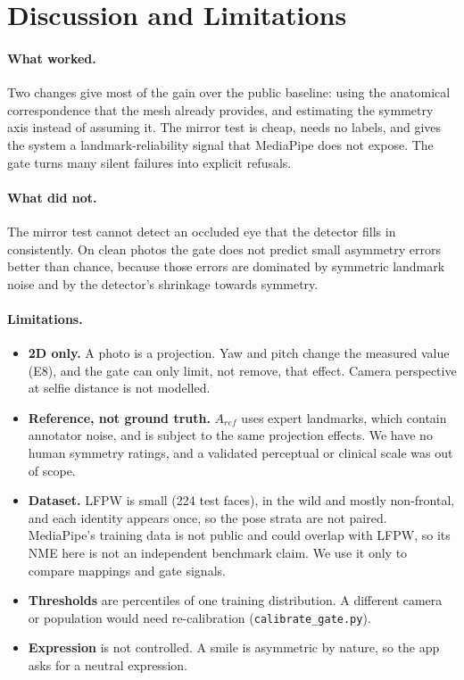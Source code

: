 \section{Discussion and Limitations}
\label{sec:discussion}

\paragraph{What worked.} Two changes give most of the gain over the public baseline: using
the anatomical correspondence that the mesh already provides, and estimating the symmetry
axis instead of assuming it. The mirror test is cheap, needs no labels, and gives the
system a landmark-reliability signal that MediaPipe does not expose. The gate turns many
silent failures into explicit refusals.

\paragraph{What did not.} The mirror test cannot detect an occluded eye that the detector
fills in consistently. On clean photos the gate does not predict small asymmetry errors
better than chance, because those errors are dominated by symmetric landmark noise and
by the detector's shrinkage towards symmetry.

\paragraph{Limitations.}
\begin{itemize}[leftmargin=*,itemsep=1pt,topsep=2pt]
\item \textbf{2D only.} A photo is a projection. Yaw and pitch change the measured value
(E8), and the gate can only limit, not remove, that effect. Camera perspective at selfie
distance is not modelled.
\item \textbf{Reference, not ground truth.} $A_{ref}$ uses expert landmarks, which contain
annotator noise, and is subject to the same projection effects. We have no human
symmetry ratings, and a validated perceptual or clinical scale was out of scope.
\item \textbf{Dataset.} LFPW is small (224 test faces), in the wild and mostly non-frontal,
and each identity appears once, so the pose strata are not paired. MediaPipe's training
data is not public and could overlap with LFPW, so its NME here is not an independent
benchmark claim. We use it only to compare mappings and gate signals.
\item \textbf{Thresholds} are percentiles of one training distribution. A different camera
or population would need re-calibration (\texttt{calibrate\_gate.py}).
\item \textbf{Expression} is not controlled. A smile is asymmetric by nature, so the app
asks for a neutral expression.
\end{itemize}

